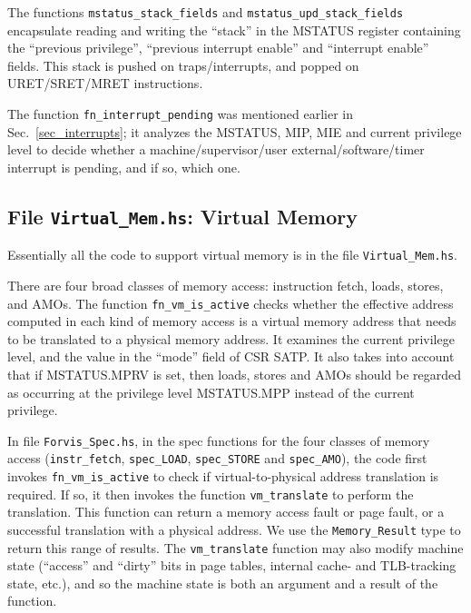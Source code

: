 \documentclass[11pt]{article}
\begin{document}
The functions \verb|mstatus_stack_fields| and
\verb|mstatus_upd_stack_fields| encapsulate reading and writing the
``stack'' in the MSTATUS register containing the ``previous
privilege'', ``previous interrupt enable'' and ``interrupt enable''
fields.  This stack is pushed on traps/interrupts, and popped on
URET/SRET/MRET instructions.

The function \verb|fn_interrupt_pending| was mentioned earlier in
Sec.~\ref{sec_interrupts}; it analyzes the MSTATUS, MIP, MIE and
current privilege level to decide whether a machine/supervisor/user
external/software/timer interrupt is pending, and if so, which one.


\subsection{File {\tt Virtual\_Mem.hs}: Virtual Memory}

\label{sec_vm}

Essentially all the code to support virtual memory is in the file
\verb|Virtual_Mem.hs|.

There are four broad classes of memory access: instruction fetch,
loads, stores, and AMOs.  The function \verb|fn_vm_is_active| checks
whether the effective address computed in each kind of memory access
is a virtual memory address that needs to be translated to a physical
memory address.  It examines the current privilege level, and the
value in the ``mode'' field of CSR SATP.  It also takes into account
that if MSTATUS.MPRV is set, then loads, stores and AMOs should be
regarded as occurring at the privilege level MSTATUS.MPP instead of
the current privilege.



In file \verb|Forvis_Spec.hs|, in the spec functions for the four
classes of memory access (\verb|instr_fetch|, \verb|spec_LOAD|,
\verb|spec_STORE| and \verb|spec_AMO|), the code first invokes
\verb|fn_vm_is_active| to check if virtual-to-physical address
translation is required.  If so, it then invokes the function
\verb|vm_translate| to perform the translation.  This function can
return a memory access fault or page fault, or a successful
translation with a physical address.  We use the \verb|Memory_Result|
type to return this range of results.  The \verb|vm_translate|
function may also modify machine state (``access'' and ``dirty'' bits
in page tables, internal cache- and TLB-tracking state, etc.), and so
the machine state is both an argument and a result of the function.
\end{document}

